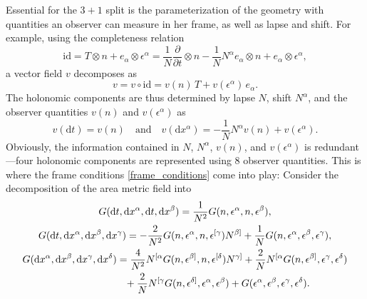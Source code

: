 Essential for the $3+1$ split is the parameterization of the geometry with quantities an observer can measure in her frame, as well as lapse and shift. For example, using the completeness relation
\begin{equation}
  \mathrm{id} = T\otimes n + e_\alpha \otimes \epsilon^\alpha = \frac{1}{N} \frac{\partial}{\partial t} \otimes n - \frac{1}{N} N^\alpha e_\alpha \otimes n + e_\alpha \otimes \epsilon^\alpha,
\end{equation}
a vector field $v$ decomposes as
\begin{equation}
  v = v\circ \mathrm{id} = v(n)\, T + v(\epsilon^\alpha)\, e_\alpha.
\end{equation}
The holonomic components are thus determined by lapse $N$, shift $N^\alpha$, and the observer quantities $v(n)$ and $v(\epsilon^\alpha)$ as
\begin{equation}
  v(\mathrm dt) = v(n)\quad\text{and}\quad v(\mathrm dx^\alpha) = -\frac{1}{N}N^\alpha v(n) + v(\epsilon^\alpha).
\end{equation}
Obviously, the information contained in $N$, $N^\alpha$, $v(n)$, and $v(\epsilon^\alpha)$ is redundant---four holonomic components are represented using 8 observer quantities. This is where the frame conditions \eqref{frame_conditions} come into play: Consider the decomposition of the area metric field into \cite{giesel_schuller_witte_wohlfarth}
\begin{gather}
  G(\mathrm dt,\mathrm dx^\alpha,\mathrm dt,\mathrm dx^\beta) = \frac{1}{N^2} G(n,\epsilon^\alpha,n,\epsilon^\beta), \\
  G(\mathrm dt,\mathrm dx^\alpha, \mathrm dx^\beta, \mathrm dx^\gamma) = -\frac{2}{N^2} G(n,\epsilon^\alpha,n,\epsilon^{\lbrack\gamma})N^{\beta\rbrack} + \frac{1}{N} G(n,\epsilon^\alpha,\epsilon^\beta,\epsilon^\gamma), \\
  \begin{aligned}
    G(\mathrm dx^\alpha, \mathrm dx^\beta, \mathrm dx^\gamma, \mathrm dx^\delta) &{} = \frac{4}{N^2} N^{\lbrack\alpha}G(n,\epsilon^{\beta\rbrack},n,\epsilon^{\lbrack\delta})N^{\gamma\rbrack} + \frac{2}{N} N^{\lbrack\alpha}G(n,\epsilon^{\beta\rbrack},\epsilon^\gamma,\epsilon^\delta) \\
                                                                                 &{} \hphantom{=} + \frac{2}{N} N^{\lbrack\gamma}G(n,\epsilon^{\delta\rbrack},\epsilon^\alpha,\epsilon^\beta) + G(\epsilon^\alpha,\epsilon^\beta,\epsilon^\gamma,\epsilon^\delta).
  \end{aligned}
\end{gather}
